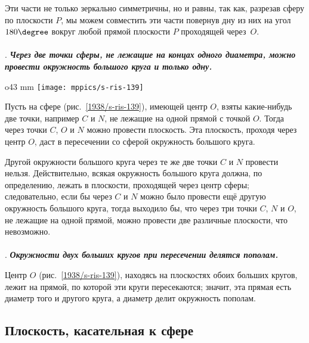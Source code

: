 Эти части не только зеркально симметричны, но и равны, так как, разрезав сферу по плоскости $P$, мы можем совместить эти части повернув дну из них на угол $180\degree$ вокруг любой прямой плоскости $P$ проходящей через~$O$.



\paragraph{}\label{1938/s129}
.
\textbf{\emph{Через две точки сферы, не лежащие на концах одного диаметра, можно провести окружность большого круга и только одну.}}

\begin{wrapfigure}{o}{43 mm}
\vskip-0mm
\centering
\texttt{[image: mppics/s-ris-139]}
\caption{}\label{1938/s-ris-139}
\vskip-0mm
\end{wrapfigure}

Пусть на сфере (рис.~\ref{1938/s-ris-139}), имеющей центр $O$, взяты какие-нибудь две точки, например $C$ и $N$, не лежащие на одной прямой с точкой $O$.
Тогда через точки $C$, $O$ и $N$ можно провести плоскость.
Эта плоскость, проходя через центр $O$, даст в пересечении со сферой окружность большого круга.

Другой окружности большого круга через те же две точки $C$ и $N$ провести нельзя.
Действительно, всякая окружность большого круга должна, по определению, лежать в плоскости, проходящей через центр сферы;
следовательно, если бы через $C$ и $N$ можно было провести ещё другую окружность большого круга, тогда выходило бы, что через три точки $C$, $N$ и $O$, не лежащие на одной прямой, можно провести две различные плоскости, что невозможно.

\paragraph{}\label{1938/s130}
.
\textbf{\emph{Окружности двух больших кругов при пересечении делятся пополам.}}

Центр $O$ (рис.~\ref{1938/s-ris-139}), находясь на плоскостях обоих больших кругов, лежит на прямой, по которой эти круги пересекаются;
значит, эта прямая есть диаметр того и другого круга, а диаметр делит окружность пополам.

\subsection*{Плоскость, касательная к сфере}

